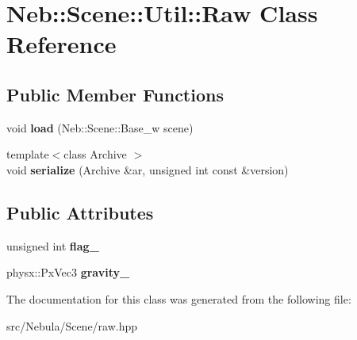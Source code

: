 \hypertarget{classNeb_1_1Scene_1_1Util_1_1Raw}{\section{\-Neb\-:\-:\-Scene\-:\-:\-Util\-:\-:\-Raw \-Class \-Reference}
\label{classNeb_1_1Scene_1_1Util_1_1Raw}
}
\subsection*{\-Public \-Member \-Functions}
\begin{DoxyCompactItemize}
\item 
\hypertarget{classNeb_1_1Scene_1_1Util_1_1Raw_aebc5cad590f48aa35e08d6d140a137b9}{void {\bfseries load} (\-Neb\-::\-Scene\-::\-Base\-\_\-w scene)}\label{classNeb_1_1Scene_1_1Util_1_1Raw_aebc5cad590f48aa35e08d6d140a137b9}

\item 
\hypertarget{classNeb_1_1Scene_1_1Util_1_1Raw_ad91dde9524013516bacba4864763bc26}{{\footnotesize template$<$class Archive $>$ }\\void {\bfseries serialize} (\-Archive \&ar, unsigned int const \&version)}\label{classNeb_1_1Scene_1_1Util_1_1Raw_ad91dde9524013516bacba4864763bc26}

\end{DoxyCompactItemize}
\subsection*{\-Public \-Attributes}
\begin{DoxyCompactItemize}
\item 
\hypertarget{classNeb_1_1Scene_1_1Util_1_1Raw_a5b82e70b2b1dbefc89778f8df93c339c}{unsigned int {\bfseries flag\-\_\-}}\label{classNeb_1_1Scene_1_1Util_1_1Raw_a5b82e70b2b1dbefc89778f8df93c339c}

\item 
\hypertarget{classNeb_1_1Scene_1_1Util_1_1Raw_aaa798f0401372c3a3727e0d0a1dc7094}{physx\-::\-Px\-Vec3 {\bfseries gravity\-\_\-}}\label{classNeb_1_1Scene_1_1Util_1_1Raw_aaa798f0401372c3a3727e0d0a1dc7094}

\end{DoxyCompactItemize}


\-The documentation for this class was generated from the following file\-:\begin{DoxyCompactItemize}
\item 
src/\-Nebula/\-Scene/raw.\-hpp\end{DoxyCompactItemize}
